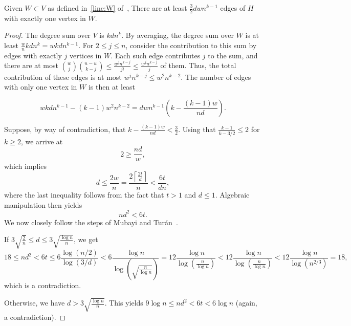 \begin{lemma}\label{lm:many_edges}
    Given $W  \subset V$ as defined in~\cref{line:W} of~,
    There are at least $\frac{3}{2}dwn^{k-1}$ edges of $H$ with exactly one vertex in $W$.
    \begin{proof}
        The degree sum over $V$ is $kdn^{k}$.
        By averaging, the degree sum over $W$ is at least
        $\frac{w}{n}kdn^{k} = wkdn^{k-1}$.
        For $2 \leq j \leq n$,
        consider the contribution to this sum by edges with exactly $j$ vertices in $W$.
        Each such edge contributes $j$ to the sum, and there are at most
        $\binom{w}{j}\binom{n-w}{k-j} \leq
        \frac{w^j n^{k-j}}{j!} \leq
        \frac{w^j n^{k-j}}{j}$ of them.
        Thus, the total contribution of these edges is at most $w^j n^{k-j} \leq w^{2}n^{k-2}$.
        The number of edges with only one vertex in $W$ is then at least

        \[
            wkdn^{k-1} - (k-1)w^{2}n^{k-2} = dwn^{k-1} \left( k - \frac{(k-1)w}{nd}\right).
        \]

        Suppose, by way of contradiction,
        that $ k - \frac{(k-1)w}{nd} < \frac{3}{2}$.
        Using that $\frac{k-1}{k-3/2} \leq 2$
        for $k \geq 2$, we arrive at
        \[
             2 \geq  \frac{nd}{w},
        \]
        which implies
        \[
            d \leq \frac{2w}{n} = \frac{2 \left\lceil\frac{2t}{d} \right\rceil}{n}
            < \frac{6t}{dn},
        \]
        where the last inequality follows from the fact that $t > 1$ and $d \leq 1$.
        Algebraic manipulation then yields
        \[
            nd^2 < 6t.
        \]
        We now closely follow the steps of Mubayi and Turán~\cite{MUBAYI2010174}.

        If $3\sqrt {\frac{2}{n}} \leq d \leq 3 \sqrt{\frac{\log n}{n}}$, we get
        \[
            18 \leq nd^2
            < 6t \leq
            6 \frac{\log (n/2)}{\log(3/d) } <
            6 \frac{\log n}{\log\left(\sqrt{\frac{n}{\log n}}\right)} =
            12 \frac{\log n}{{\log \left( \frac{n}{\log n} \right)}} <
            12 \frac{\log n}{{\log \left( \frac{n}{\log n} \right)}} <
            12 \frac{\log n}{{\log \left( n^{2/3} \right)}} =
            18,
        \]
        which is a contradiction.

        Otherwise, we have $d > 3 \sqrt{\frac{\log n}{n}}$.
        This yields $9 \log n \leq nd^2 < 6t < 6 \log n$
        (again, a contradiction).
    \end{proof}
\end{lemma}

